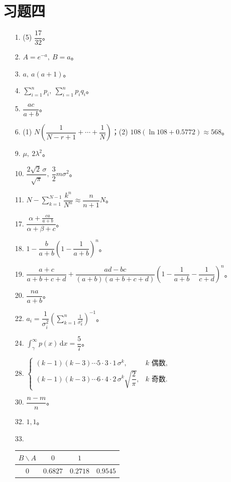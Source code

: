 \documentclass[../main.tex]{subfiles}
\begin{document}
\section*{习题四}

\begin{enumerate}
\item[1.] (5) $\dfrac{17}{32}$。
\item[2.] $A=e^{-a},\ B=a$。
\item[3.] $a,\ a(a+1)$。
\item[4.] $\displaystyle\sum_{i=1}^{n}p_i,\ \displaystyle\sum_{i=1}^{n}p_i q_i$。
\item[5.] $\dfrac{ac}{a+b}$。
\item[6.] (1) $N\left(\dfrac{1}{N-r+1}+\cdots+\dfrac{1}{N}\right)$；(2) $108(\ln 108+0.5772)\approx 568$。
\item[9.] $\mu,\ 2\lambda^{2}$。
\item[10.] $\dfrac{2\sqrt{2}\,\sigma}{\sqrt{\pi}},\ \dfrac{3}{2}m\sigma^{2}$。
\item[11.] $N-\displaystyle\sum_{k=1}^{N-1}\dfrac{k^{n}}{N^{n}}\approx\dfrac{n}{n+1}N$。
\item[17.] $\dfrac{\alpha+\frac{ca}{a+b}}{\alpha+\beta+c}$。
\item[18.] $1-\dfrac{b}{a+b}\left(1-\dfrac{1}{a+b}\right)^{n}$。
\item[19.] $\dfrac{a+c}{a+b+c+d}+\dfrac{ad-bc}{(a+b)(a+b+c+d)}\left(1-\dfrac{1}{a+b}-\dfrac{1}{c+d}\right)^{n}$。
\item[20.] $\dfrac{na}{a+b}$。
\item[22.] $a_i=\dfrac{1}{\sigma_i^{2}}\left(\displaystyle\sum_{k=1}^{n}\frac{1}{\sigma_k^{2}}\right)^{-1}$。
\item[24.] $\displaystyle\int_{\gamma}^{\infty}p(x)\,\mathrm{d}x=\dfrac{5}{7}$。
\item[28.] $\begin{cases}(k-1)(k-3)\cdots 5\cdot 3\cdot 1\,\sigma^{k}, & k\text{ 偶数},\\(k-1)(k-3)\cdots 6\cdot 4\cdot 2\,\sigma^{k}\sqrt{\dfrac{2}{\pi}}, & k\text{ 奇数}.\end{cases}$
\item[30.] $\dfrac{n-m}{n}$。
\item[32.] $1,1$。
\item[33.] \begin{center}\begin{tabular}{c|cc|c}
$B\backslash A$ & $0$ & $1$ & \\
\hline
$0$ & $0.6827$ & $0.2718$ & $0.9545$\\

\end{tabular}
\end{center}
\end{enumerate}
\end{document}
